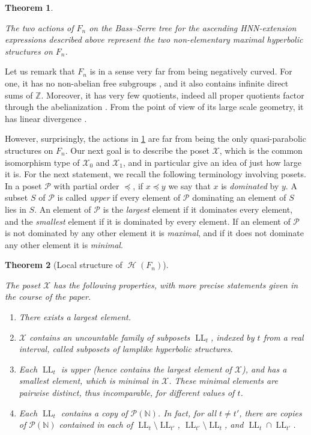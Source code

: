 \documentclass[reqno,12pt]{amsart}\setcounter{tocdepth}{1}
\newtheorem{thmA}{Theorem}
\theoremstyle{definition}
\newcommand{\N}{\mathbb{N}}
\newcommand{\Z}{\mathbb{Z}}
\DeclareMathOperator{\Hyp}{\mathcal{H}}
\DeclareMathOperator{\LL}{LL}
\newcommand{\X}{\mathcal{X}}
\numberwithin{equation}{section}
\begin{document}
\begin{thmA}%
\label{intro:thm:largest}

The two actions of $F_n$ on the Bass--Serre tree for the ascending HNN-extension expressions described above represent the two non-elementary maximal hyperbolic structures on $F_n$.
\end{thmA}

Let us remark that $F_n$ is in a sense very far from being negatively curved. For one, it has no non-abelian free subgroups \cite{brin85}, and it also contains infinite direct sums of $\Z$. Moreover, it has very few quotients, indeed all proper quotients factor through the abelianization \cite{brown87}. From the point of view of its large scale geometry, it has linear divergence \cite{divergence, divergencen}.

However, surprisingly, the actions in \cref{intro:thm:largest} are far from being the only quasi-parabolic structures on $F_n$. Our next goal is to describe the poset $\X$, which is the common isomorphism type of $\X_0$ and $\X_1$, and in particular give an idea of just how large it is. For the next statement, we recall the following terminology involving posets. In a poset $\mathcal{P}$ with partial order $\preccurlyeq$, if $x\preccurlyeq y$ we say that $x$ is \emph{dominated} by $y$. A subset $S$ of $\mathcal{P}$ is called \emph{upper} if every element of $\mathcal{P}$ dominating an element of $S$ lies in $S$. An element of $\mathcal{P}$ is the \emph{largest} element if it dominates every element, and the \emph{smallest} element if it is dominated by every element. If an element of $\mathcal{P}$ is not dominated by any other element it is \emph{maximal}, and if it does not dominate any other element it is \emph{minimal}.

\begin{thmA}[Local structure of $\Hyp(F_n)$]
\label{intro:thm:local}

The poset $\X$ has the following properties, with more precise statements given in the course of the paper.
\begin{enumerate}
	\item There exists a largest element.
	\item $\X$ contains an uncountable family of subposets $\LL_t$, indexed by $t$ from a real interval, called subposets of \emph{lamplike} hyperbolic structures.
	\item Each $\LL_t$ is upper (hence contains the largest element of $\X$), and has a smallest element, which is minimal in $\X$. These minimal elements are pairwise distinct, thus incomparable, for different values of $t$. 
	\item Each $\LL_t$ contains a copy of $\mathcal{P}(\N)$. In fact, for all $t\ne t'$, there are copies of $\mathcal{P}(\N)$ contained in each of $\LL_t \setminus \LL_{t'}$, $\LL_{t'}\setminus \LL_t$, and $\LL_t\cap \LL_{t'}$.
\end{enumerate}
\end{thmA}
\end{document}
